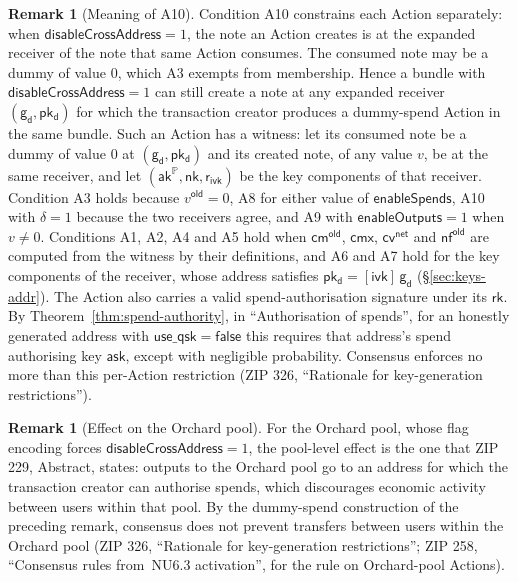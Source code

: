 \documentclass[11pt,a4paper]{article}
\theoremstyle{definition}
\newtheorem{remark}[theorem]{Remark}
\newcommand{\PP}{\mathbb{P}}
\newcommand{\nfsym}{\mathsf{nf}}
\newcommand{\cmsym}{\mathsf{cm}}
\newcommand{\cmx}{\mathsf{cmx}}
\newcommand{\cvsym}{\mathsf{cv}}
\newcommand{\rk}{\mathsf{rk}}
\newcommand{\ask}{\ensuremath{\mathsf{ask}}}
\newcommand{\aksym}{\ensuremath{\mathsf{ak}}}
\newcommand{\nksym}{\ensuremath{\mathsf{nk}}}
\newcommand{\ivk}{\ensuremath{\mathsf{ivk}}}
\newcommand{\pkd}{\ensuremath{\mathsf{pk_d}}}
\newcommand{\gd}{\ensuremath{\mathsf{g_d}}}
\newcommand{\rivk}{\ensuremath{\mathsf{r_{ivk}}}}
\begin{document}
\begin{remark}[Meaning of A10]
Condition A10 constrains each Action separately: when
$\mathsf{disableCrossAddress} = 1$, the note an Action creates is at the
expanded receiver of the note that same Action consumes. The consumed note
may be a dummy of value $0$, which A3 exempts from membership. Hence a bundle
with $\mathsf{disableCrossAddress} = 1$ can still create a note at any
expanded receiver $(\gd, \pkd)$ for which the transaction creator produces a
dummy-spend Action in the same bundle. Such an Action has a witness: let its
consumed note be a dummy of value $0$ at $(\gd, \pkd)$ and its created note,
of any value $v$, be at the same receiver, and let $(\aksym^{\PP}, \nksym,
\rivk)$ be the key components of that receiver. Condition A3 holds because
$v^{\mathsf{old}} = 0$, A8 for either value of $\mathsf{enableSpends}$, A10
with $\delta = 1$ because the two receivers agree, and A9 with
$\mathsf{enableOutputs} = 1$ when $v \neq 0$. Conditions A1, A2, A4 and A5
hold when $\cmsym^{\mathsf{old}}$, $\cmx$, $\cvsym^{\mathsf{net}}$ and
$\nfsym^{\mathsf{old}}$ are computed from the witness by their definitions,
and A6 and A7 hold for the key components of the receiver, whose address
satisfies $\pkd = [\ivk]\,\gd$ (\S\ref{sec:keys-addr}). The Action also
carries a valid spend-authorisation signature under its $\rk$. By
Theorem~\ref{thm:spend-authority}, in ``Authorisation of spends'', for an
honestly generated address with $\mathsf{use\_qsk} = \mathsf{false}$ this
requires that address's spend authorising key $\ask$, except with negligible
probability. Consensus enforces no more than this per-Action restriction
(ZIP 326, ``Rationale for key-generation restrictions'').
\end{remark}

\begin{remark}[Effect on the Orchard pool]
For the Orchard pool, whose flag encoding forces
$\mathsf{disableCrossAddress} = 1$, the pool-level effect is the one that
ZIP 229, Abstract, states: outputs to the Orchard pool go to an address for
which the transaction creator can authorise spends, which discourages
economic activity between users within that pool. By the dummy-spend
construction of the preceding remark, consensus does not prevent transfers
between users within the Orchard pool (ZIP 326, ``Rationale for
key-generation restrictions''; ZIP 258, ``Consensus rules from~NU6.3
activation'', for the rule on Orchard-pool Actions).
\end{remark}
\end{document}
